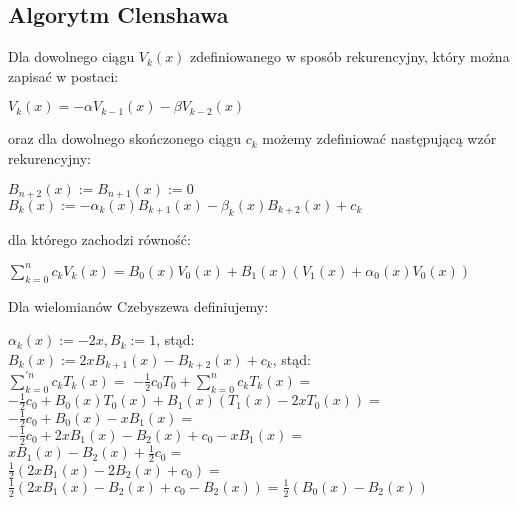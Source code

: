 \documentclass[10pt]{article}
\begin{document}
\subsection{Algorytm Clenshawa}
Dla dowolnego ciągu $V_{k}(x)$ zdefiniowanego w sposób rekurencyjny, który można zapisać w postaci:
\begin{center}
$V_{k}(x) = - \alpha V_{k-1}(x) - \beta V_{k-2}(x)$
\end{center}
oraz dla dowolnego skończonego ciągu $c_{k}$ możemy zdefiniować następującą wzór rekurencyjny:
\begin{center}
$B_{n+2}(x) := B_{n+1}(x) := 0$ \\
\vspace{0.2em} $B_{k}(x) := - \alpha_{k}(x) B_{k+1}(x) - \beta_{k}(x) B_{k+2}(x) + c_{k}$ 
\end{center}
dla którego zachodzi równość:
\begin{center}
$\sum_{k=0}^{n} c_{k} V_{k}(x) = B_{0}(x) V_{0}(x) + B_{1}(x) (V_{1}(x) + \alpha_{0}(x) V_{0}(x)) $
\end{center}
Dla wielomianów Czebyszewa definiujemy:
\begin{center}
$\alpha_{k}(x) := -2x, B_{k} := 1$, stąd: \\
\vspace{0.2em} $B_{k}(x) := 2x B_{k+1}(x) - B_{k+2}(x) + c_{k}$, stąd: \\
\vspace{0.2em} $\sum_{k=0}^{'n} c_{k} T_{k}(x) =$ 
$- \frac{1}{2} c_{0} T_{0} + \sum_{k=0}^{n} c_{k} T_{k}(x) =$ \\
\vspace{0.2em} $- \frac{1}{2} c_{0} + B_{0}(x) T_{0}(x) + B_{1}(x) (T_{1}(x) - 2x T_{0}(x)) =$ \\
\vspace{0.2em} $- \frac{1}{2} c_{0} + B_{0}(x) - x B_{1}(x) = $ \\
\vspace{0.2em} $- \frac{1}{2} c_{0} + 2x B_{1}(x) - B_{2}(x) + c_{0} - x B_{1}(x) = $ \\
\vspace{0.2em} $x B_{1}(x) - B_{2}(x) + \frac{1}{2} c_{0} = $ \\
\vspace{0.2em} $\frac{1}{2} ( 2x B_{1}(x) - 2 B_{2}(x) + c_{0}) = $ \\
\vspace{0.2em} $\frac{1}{2} ( 2x B_{1}(x) - B_{2}(x) + c_{0} - B_{2}(x)) = \frac{1}{2} ( B_{0}(x) - B_{2}(x))$
\end{center}
\end{document}
